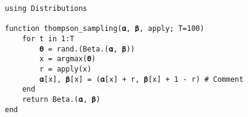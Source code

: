 \documentclass[12pt, oneside]{book}
\title{\booktitle}
\author{\authorname}
\theoremstyle{plain}
\theoremstyle{definition}
\begin{document}
% 

\frontmatter


% 

\newpage
\tableofcontents
% 

\mainmatter
\newpage
% 
% 
% 

\begin{lstlisting}[language=JuliaLocal, style=julia]
using Distributions

function thompson_sampling(𝛂, 𝛃, apply; T=100)
    for t in 1:T
        𝛉 = rand.(Beta.(𝛂, 𝛃))
        x = argmax(𝛉)
        r = apply(x)
        𝛂[x], 𝛃[x] = (𝛂[x] + r, 𝛃[x] + 1 - r) # Comment
    end
    return Beta.(𝛂, 𝛃)
end
\end{lstlisting}





\end{document}
